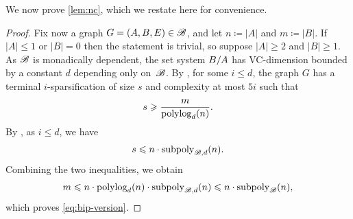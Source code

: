 We now prove \cref{lem:nc}, which we restate here for convenience.

\lemnc*

\begin{proof}
Fix now a graph $G=(A,B,E)\in{\mathscr B}$,
and let $n\coloneqq |A|$ and $m\coloneqq |B|$.
If $|A|\le 1$ or $|B|=0$ then the statement is trivial, so suppose $|A|\ge 2$ and $|B|\ge 1$.
As ${\mathscr B}$ is monadically dependent, the set system $B/A$ has
VC-dimension bounded by a constant $d$ depending only on~${\mathscr B}$.
By , for some $i\le d$, the graph $G$ has a
terminal $i$-sparsification of size $s$ and complexity at most $5i$ such
that
\[
  s\geqslant \frac{m}{\operatorname{polylog}_d(n)}.
\]
By , as $i\le d$, we have
\[
  s
  \leqslant n\cdot \operatorname{subpoly}_{{\mathscr B},d}(n).
\]
Combining the two inequalities, we obtain
\[
  m
  \leqslant n\cdot \operatorname{polylog}_d(n)\cdot \operatorname{subpoly}_{{\mathscr B},d}(n)\leqslant n\cdot \operatorname{subpoly}_{{\mathscr B}}(n),
\]
 which proves  \eqref{eq:bip-version}.
\end{proof}
